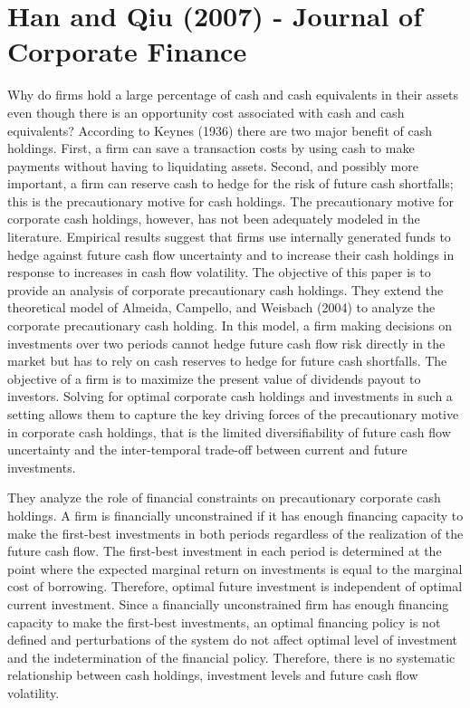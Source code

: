 \documentclass{article}
\begin{document}
{\section{Han and Qiu (2007) - Journal of Corporate Finance}

Why do firms hold a large percentage of cash and cash equivalents in their assets even though there is an opportunity cost associated with cash and cash equivalents? According to Keynes (1936) there are two major benefit of cash holdings. First, a firm can save a transaction costs by using cash to make payments without having to liquidating assets. Second, and possibly more important, a firm can reserve cash to hedge for the risk of future cash shortfalls; this is the precautionary motive for cash holdings. The precautionary motive for corporate cash holdings, however, has not been adequately modeled in the literature. Empirical results suggest that firms use internally generated funds to hedge against future cash flow uncertainty and to increase their cash holdings in response to increases in cash flow volatility. The objective of this paper is to provide an analysis of corporate precautionary cash holdings. They extend the theoretical model of Almeida, Campello, and Weisbach (2004) to analyze the corporate precautionary cash holding. In this model, a firm making decisions on investments over two periods cannot hedge future cash flow risk directly in the market but has to rely on cash reserves to hedge for future cash shortfalls. The objective of a firm is to maximize the present value of dividends payout to investors. Solving for optimal corporate cash holdings and investments in such a setting allows them to capture the key driving forces of the precautionary motive in corporate cash holdings, that is the limited diversifiability of future cash flow uncertainty and the inter-temporal trade-off between current and future investments.

They analyze the role of financial constraints on precautionary corporate cash holdings. A firm is financially unconstrained if it has enough financing capacity to make the first-best investments in both periods regardless of the realization of the future cash flow. The first-best investment in each period is determined at the point where the expected marginal return on investments is equal to the marginal cost of borrowing. Therefore, optimal future investment is independent of optimal current investment. Since a financially unconstrained firm has enough financing capacity to make the first-best investments, an optimal financing policy is not defined and perturbations of the system do not affect optimal level of investment and the indetermination of the financial policy. Therefore, there is no systematic relationship between cash holdings, investment levels and future cash flow volatility. 

}
\end{document}
